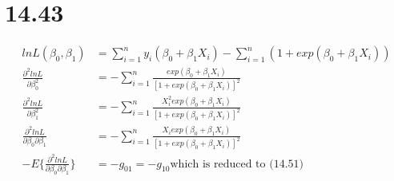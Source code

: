 \documentclass{article}\usepackage[]{graphicx}\usepackage[]{color}
\begin{document}
\section{14.43}

\begin{displaymath}
\begin{split}
  lnL(\beta_0, \beta_1) &= \sum_{i=1}^n y_i(\beta_0+\beta_1 X_i) - \sum_{i=1}^n(1+exp(\beta_0+\beta_1 X_i))\\
  \frac{\partial^2 lnL}{\partial \beta_0^2} &= - \sum_{i=1}^n \frac{exp(\beta_0+\beta_1 X_i)}{[1+exp(\beta_0+\beta_1 X_i)]^2}\\
  \frac{\partial^2 lnL}{\partial \beta_1^2} &= - \sum_{i=1}^n \frac{X_i^2 exp(\beta_0+\beta_1 X_i)}{[1+exp(\beta_0+\beta_1 X_i)]^2}\\
  \frac{\partial^2 lnL}{\partial \beta_0 \partial \beta_1} &= - \sum_{i=1}^n \frac{X_i exp(\beta_0+\beta_1 X_i)}{[1+exp(\beta_0+\beta_1 X_i)]^2}\\
  -E\{ \frac{\partial^2 lnL}{\partial \beta_0 \partial \beta_1} \} &= -g_{01} = -g_{10}
  \text{which is reduced to (14.51)}
\end{split}
\end{displaymath}
\end{document}
